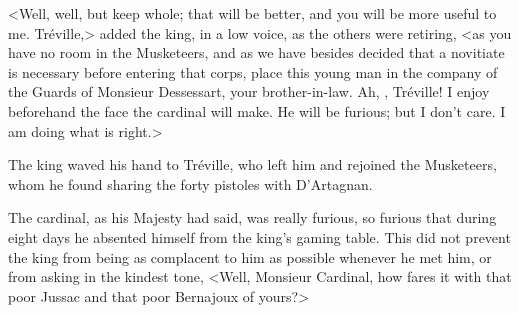<Well, well, but keep whole; that will be better, and you will be more useful to me. Tréville,> added the king, in a low voice, as the others were retiring, <as you have no room in the Musketeers, and as we have besides decided that a novitiate is necessary before entering that corps, place this young man in the company of the Guards of Monsieur Dessessart, your brother-in-law. Ah, , Tréville! I enjoy beforehand the face the cardinal will make. He will be furious; but I don't care. I am doing what is right.> 

The king waved his hand to Tréville, who left him and rejoined the Musketeers, whom he found sharing the forty pistoles with D'Artagnan. 

The cardinal, as his Majesty had said, was really furious, so furious that during eight days he absented himself from the king's gaming table. This did not prevent the king from being as complacent to him as possible whenever he met him, or from asking in the kindest tone, <Well, Monsieur Cardinal, how fares it with that poor Jussac and that poor Bernajoux of yours?>